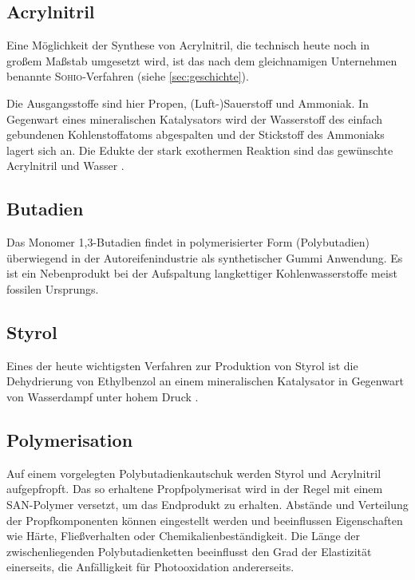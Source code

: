         \subsection{Acrylnitril}
            Eine Möglichkeit der Synthese von Acrylnitril, die technisch heute noch in großem Maßstab umgesetzt wird, ist das nach dem gleichnamigen
            Unternehmen benannte \textsc{Sohio}-Verfahren (siehe \cref{sec:geschichte}).

            Die Ausgangsstoffe sind hier Propen, (Luft-)Sauerstoff und Ammoniak. In Gegenwart eines mineralischen Katalysators wird der Wasserstoff
            des einfach gebundenen Kohlenstoffatoms abgespalten und der Stickstoff des Ammoniaks lagert sich an. Die Edukte der
            stark exothermen Reaktion sind das gewünschte Acrylnitril und Wasser \cite{sohio.process.patent.1959.9201957}.

        \subsection{Butadien}
            Das Monomer 1,3-Butadien findet in polymerisierter Form (Polybutadien) überwiegend in der Autoreifenindustrie als synthetischer Gummi
            Anwendung. Es ist ein Nebenprodukt bei der Aufspaltung langkettiger Kohlenwasserstoffe meist fossilen Ursprungs.

        \subsection{Styrol}
            Eines der heute wichtigsten Verfahren zur Produktion von Styrol ist die Dehydrierung von Ethylbenzol
            an einem mineralischen Katalysator in Gegenwart von Wasserdampf unter hohem Druck \cite{styrol.synthese.Liquid.Phase.Alkylation.of.Benzene.Bellussi.1995}.

        \subsection{Polymerisation}
            Auf einem vorgelegten Polybutadienkautschuk werden Styrol und Acrylnitril aufgepfropft. Das so erhaltene Propfpolymerisat
            wird in der Regel mit einem SAN-Polymer versetzt, um das Endprodukt zu erhalten. Abstände und Verteilung der
            Propfkomponenten können eingestellt werden und beeinflussen Eigenschaften wie Härte, Fließverhalten oder
            Chemikalienbeständigkeit. Die Länge der zwischenliegenden Polybutadienketten beeinflusst den Grad der Elastizität
            einerseits, die Anfälligkeit für Photooxidation andererseits\cite{Domininghaus.1998.Kunststoffe.und.ihre.Eigenschaften}.
        
